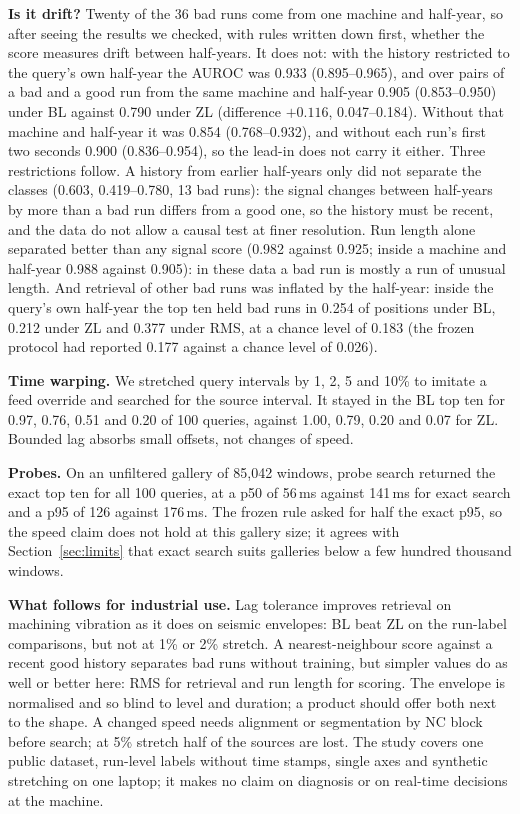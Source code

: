 \textbf{Is it drift?} Twenty of the 36 bad runs come from one machine and half-year, so after seeing the results we
checked, with rules written down first, whether the score measures drift between half-years. It does not: with the
history restricted to the query's own half-year the AUROC was 0.933 (0.895--0.965), and over pairs of a bad and a good
run from the same machine and half-year 0.905 (0.853--0.950) under BL against 0.790 under ZL (difference $+0.116$,
0.047--0.184). Without that machine and half-year it was 0.854 (0.768--0.932), and without each run's first two seconds 0.900
(0.836--0.954), so the lead-in does not carry it either. Three restrictions follow. A history
from earlier half-years only did not separate the classes (0.603, 0.419--0.780, 13 bad runs): the signal changes
between half-years by more than a bad run differs from a good one, so the history must be recent, and the data do not
allow a causal test at finer resolution. Run length alone separated better than any signal score (0.982 against 0.925;
inside a machine and half-year 0.988 against 0.905): in these data a bad run is mostly a run of unusual length.
And retrieval of other bad runs was inflated by the half-year: inside the query's own half-year the top ten held bad
runs in 0.254 of positions under BL, 0.212 under ZL and 0.377 under RMS, at a chance level of 0.183 (the frozen
protocol had reported 0.177 against a chance level of 0.026).

\textbf{Time warping.} We stretched query intervals by 1, 2, 5 and 10\% to imitate a feed override and searched for
the source interval. It stayed in the BL top ten for 0.97, 0.76, 0.51 and 0.20 of 100 queries, against 1.00, 0.79,
0.20 and 0.07 for ZL. Bounded lag absorbs small offsets, not changes of speed.

\textbf{Probes.} On an unfiltered gallery of 85,042 windows, probe search returned the exact top ten for all 100
queries, at a p50 of 56\,ms against 141\,ms for exact search and a p95 of 126 against 176\,ms. The frozen rule asked
for half the exact p95, so the speed claim does not hold at this gallery size; it agrees with Section~\ref{sec:limits}
that exact search suits galleries below a few hundred thousand windows.

\textbf{What follows for industrial use.} Lag tolerance improves retrieval on machining vibration as it does on
seismic envelopes: BL beat ZL on the run-label comparisons, but not at 1\% or 2\% stretch. A nearest-neighbour score against a
recent good history separates bad runs without training, but simpler values do as well or better here: RMS for
retrieval and run length for scoring. The envelope is normalised and so blind to level and duration; a product should
offer both next to the shape.
A changed speed needs alignment or segmentation by NC block before search; at 5\% stretch half of the sources are
lost. The study covers one public dataset, run-level labels without time stamps, single axes and synthetic stretching
on one laptop; it makes no claim on diagnosis or on real-time decisions at the machine.

